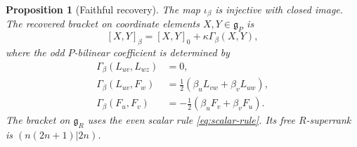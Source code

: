 \documentclass[11pt]{article}
\numberwithin{equation}{section}
\newtheorem{proposition}[theorem]{Proposition}
\theoremstyle{remark}
\begin{document}
\begin{proposition}[Faithful recovery]\label{prop:recovery}
The map $\iota_\beta$ is injective with closed image. The recovered bracket on
coordinate elements $X,Y\in\mathfrak g_P$ is
\begin{equation}\label{eq:deformed-bracket}
 [X,Y]_\beta=[X,Y]_0+\kappa\Gamma_\beta(X,Y),
\end{equation}
where the odd $P$-bilinear coefficient is determined by
\begin{align}
 \Gamma_\beta(L_{uv},L_{wz})&=0,\label{eq:gamma-ll}\\
 \Gamma_\beta(L_{uv},F_w)&=\tfrac{1}{2}(\beta_uL_{vw}+\beta_vL_{uw}),\label{eq:gamma-lf}\\
 \Gamma_\beta(F_u,F_v)&=-\tfrac{1}{2}(\beta_uF_v+\beta_vF_u).\label{eq:gamma-ff}
\end{align}
The bracket on $\mathfrak g_R$ uses the even scalar rule \eqref{eq:scalar-rule}.
Its free $R$-superrank is $(n(2n+1)|2n)$.
\end{proposition}
\end{document}

